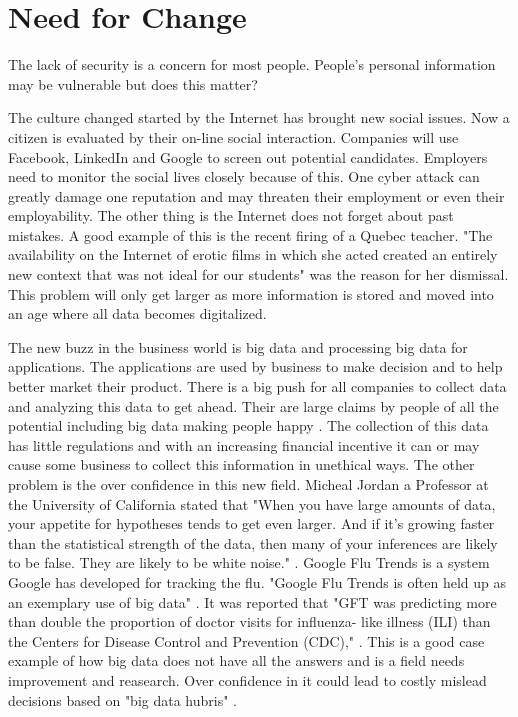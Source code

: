 \documentclass[12pt]{article}
\begin{document}
\section{Need for Change}\label{sec:change}
The lack of security is a concern for most people. People's personal information may be vulnerable but does this matter?

The culture changed started by the Internet has brought new social issues. Now a citizen is evaluated by their on-line social interaction. Companies will use Facebook, LinkedIn and Google to screen out potential candidates. Employers need to monitor the social lives closely because of this. One cyber attack can greatly damage one reputation and may threaten their employment or even their employability. The other thing is the Internet does not forget about past mistakes. A good example of this is the recent firing of a Quebec teacher. "The availability on the Internet of erotic films in which she acted created an entirely new context that was not ideal for our students" \cite{Peritz} was the reason for her dismissal. This problem will only get larger as more information is stored and moved into an age where all data becomes digitalized.

The new buzz in the business world is big data and processing big data for applications. The applications are used by business to make decision and to help better market their product. There is a big push for all companies to collect data and analyzing this data to get ahead. Their are large claims by people of all the potential including big data making people happy \cite{Banayan}. The collection of this data has little regulations and with an increasing financial incentive it can or may cause some business to collect this information in unethical ways. The other problem is the over confidence in this new field. Micheal Jordan a Professor at the University of California stated that "When you have large amounts of data, your appetite for hypotheses tends to get even larger. And if it’s growing faster than the statistical strength of the data, then many of your inferences are likely to be false. They are likely to be white noise." \cite{Gomes}. Google Flu Trends is a system Google has developed for tracking the flu. "Google Flu Trends is often held 
up as an exemplary use of big data" \cite{Lazer}. It was reported that "GFT was predicting more than double the proportion of doctor visits for influenza- like illness (ILI) than the Centers for Disease Control and Prevention (CDC)," \cite{Lazer}. This is a good case example of how big data does not have all the answers and is a field needs improvement and reasearch. Over confidence in it could lead to costly mislead decisions based on "big data hubris" \cite{Lazer}.
\end{document}
